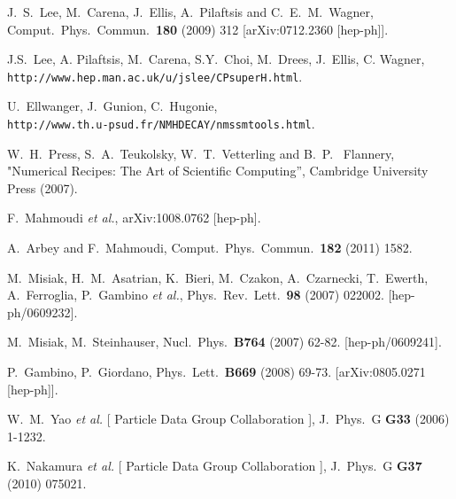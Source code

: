 \documentclass[12pt,a4paper]{article}
\begin{document}
\begin{thebibliography}{}
  J.~S.~Lee, M.~Carena, J.~Ellis, A.~Pilaftsis and C.~E.~M.~Wagner,
  Comput.\ Phys.\ Commun.\  {\bf 180} (2009) 312
  [arXiv:0712.2360 [hep-ph]].
  
  J.S.~Lee, A. Pilaftsis, M.~Carena, S.Y.~Choi, M.~Drees, J.~Ellis, C. Wagner,\\
  \verb|http://www.hep.man.ac.uk/u/jslee/CPsuperH.html|.
  
  U.~Ellwanger, J.~Gunion, C.~Hugonie,\\
  \verb|http://www.th.u-psud.fr/NMHDECAY/nmssmtools.html|.


W.~H.~Press, S.~A.~Teukolsky,
W.~T.~Vetterling and  B.~P.~ Flannery,  
"Numerical Recipes: The Art of Scientific Computing'', Cambridge University
Press (2007).

  F.~Mahmoudi {\it et al.},
  arXiv:1008.0762 [hep-ph].

  A.~Arbey and F.~Mahmoudi,
  Comput.\ Phys.\ Commun.\  {\bf 182} (2011) 1582.

  M.~Misiak, H.~M.~Asatrian, K.~Bieri, M.~Czakon, A.~Czarnecki, T.~Ewerth, A.~Ferroglia, P.~Gambino {\it et al.},
  Phys.\ Rev.\ Lett.\  {\bf 98 } (2007)  022002.
  [hep-ph/0609232].

  M.~Misiak, M.~Steinhauser,
  Nucl.\ Phys.\  {\bf B764 } (2007)  62-82.
  [hep-ph/0609241].

  P.~Gambino, P.~Giordano,
  Phys.\ Lett.\  {\bf B669 } (2008)  69-73.
  [arXiv:0805.0271 [hep-ph]].

  W.~M.~Yao {\it et al.} [ Particle Data Group Collaboration ],
  J.\ Phys.\ G {\bf G33 } (2006)  1-1232.

  K.~Nakamura {\it et al.} [ Particle Data Group Collaboration ],
  J.\ Phys.\ G {\bf G37 } (2010)  075021.
  

\end{thebibliography}
\end{document}

